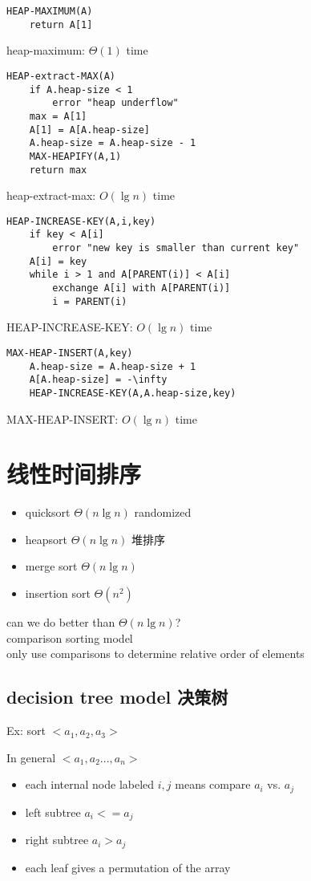 \documentclass{article}
\begin{document}
\begin{verbatim}
HEAP-MAXIMUM(A)
    return A[1]
\end{verbatim}
heap-maximum: $\Theta(1)$ time

\begin{verbatim}
HEAP-extract-MAX(A)
    if A.heap-size < 1
        error "heap underflow"
    max = A[1]
    A[1] = A[A.heap-size]
    A.heap-size = A.heap-size - 1
    MAX-HEAPIFY(A,1)
    return max
\end{verbatim}
heap-extract-max: $O(\lg n )$ time

\begin{verbatim}
HEAP-INCREASE-KEY(A,i,key)
    if key < A[i]
        error "new key is smaller than current key"
    A[i] = key
    while i > 1 and A[PARENT(i)] < A[i]
        exchange A[i] with A[PARENT(i)]
        i = PARENT(i)
\end{verbatim}
HEAP-INCREASE-KEY: $O(\lg n )$ time

\begin{verbatim}
MAX-HEAP-INSERT(A,key)
    A.heap-size = A.heap-size + 1
    A[A.heap-size] = -\infty
    HEAP-INCREASE-KEY(A,A.heap-size,key)
\end{verbatim}
MAX-HEAP-INSERT: $O(\lg n )$ time

\section{线性时间排序}
\begin{itemize}
\item quicksort $\Theta(n\lg n )$  randomized
\item heapsort $\Theta(n\lg n )$ 堆排序
\item merge sort $\Theta(n\lg n )$
\item insertion sort $\Theta(n^2)$
\end{itemize}

can we do better than $\Theta(n\lg n )$?\\
comparison sorting model\\
only use comparisons to determine relative order of elements

\subsection{decision tree model 决策树}
Ex: sort $<a_1, a_2, a_3>$

In general $<a_1,a_2...,a_n>$
\begin{itemize}
\item each internal node labeled $i, j$ means compare $a_i$ vs. $a_j$
\item left subtree $a_i <= a_j$
\item right subtree $a_i > a_j$
\item each leaf gives a permutation of the array
\end{itemize}
\end{document}
